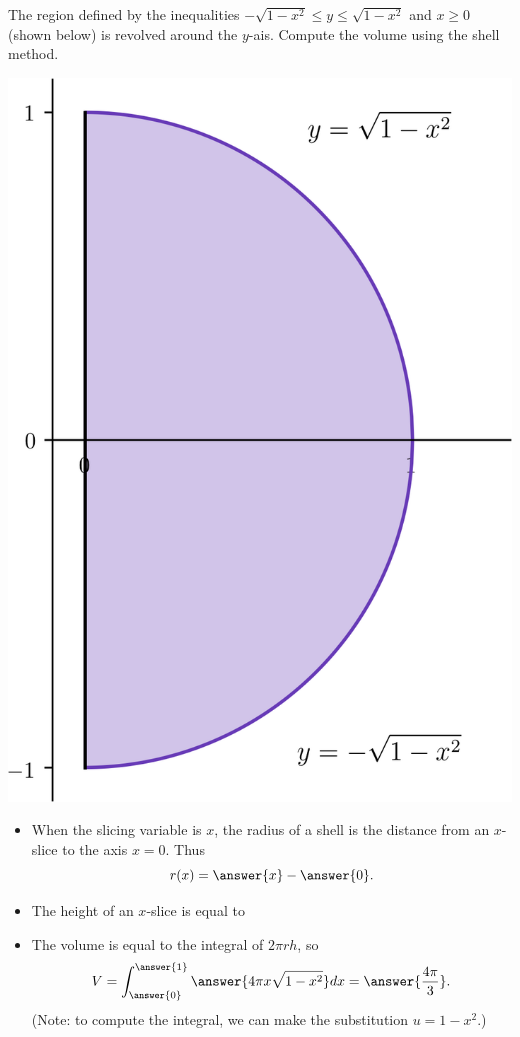 \documentclass{ximera}
\begin{document}
\begin{example}
The region defined by the inequalities $-\sqrt{1-x^2} \leq y \leq \sqrt{1-x^2}$ and $x \geq 0$ (shown below) is revolved around the $y$-ais. Compute the volume using the shell method.
\begin{center}
\begin{image}
\includegraphics{shell/shell01.png}
\end{image}
\end{center}
\begin{itemize}
\item When the slicing variable is $x$, the radius of a shell is the  distance from an $x$-slice to the axis $x = 0$. Thus
\[ r(x) = \answer{x} - \answer{0}. \]
\item The height of an $x$-slice is equal to
\begin{multipleChoice}
\end{multipleChoice}
\item The volume is equal to the integral of $2 \pi r h$, so 
\[ V = \int_{\answer{0}}^{\answer{1}} \answer{4 \pi x \sqrt{1-x^2}} dx = \answer{\frac{4\pi}{3}}. \]
(Note: to compute the integral, we can make the substitution $u = 1-x^2$.)
\end{itemize}
\end{example}
\end{document}
